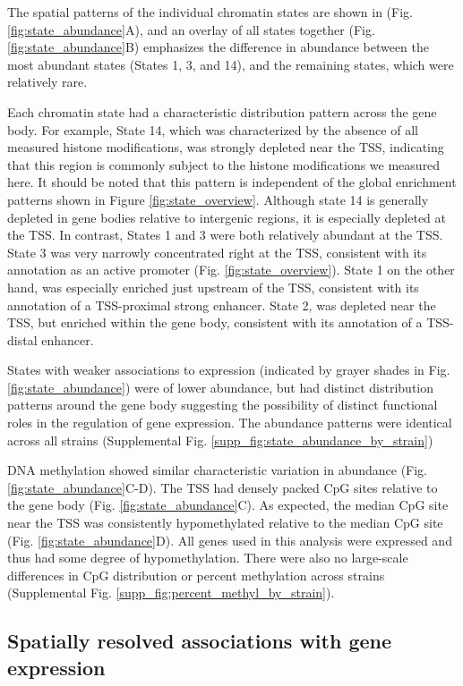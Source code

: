 \documentclass[
  11pt,
]{article}
\begin{document}
The spatial patterns of the individual chromatin states are shown in
(Fig. \ref{fig:state_abundance}A), and an overlay of all states together
(Fig. \ref{fig:state_abundance}B) emphasizes the difference in abundance
between the most abundant states (States 1, 3, and 14), and the
remaining states, which were relatively rare.

Each chromatin state had a characteristic distribution pattern across
the gene body. For example, State 14, which was characterized by the
absence of all measured histone modifications, was strongly depleted
near the TSS, indicating that this region is commonly subject to the
histone modifications we measured here. It should be noted that this
pattern is independent of the global enrichment patterns shown in Figure
\ref{fig:state_overview}. Although state 14 is generally depleted in
gene bodies relative to intergenic regions, it is especially depleted at
the TSS. In contrast, States 1 and 3 were both relatively abundant at
the TSS. State 3 was very narrowly concentrated right at the TSS,
consistent with its annotation as an active promoter (Fig.
\ref{fig:state_overview}). State 1 on the other hand, was especially
enriched just upstream of the TSS, consistent with its annotation of a
TSS-proximal strong enhancer. State 2, was depleted near the TSS, but
enriched within the gene body, consistent with its annotation of a
TSS-distal enhancer.

States with weaker associations to expression (indicated by grayer
shades in Fig. \ref{fig:state_abundance}) were of lower abundance, but
had distinct distribution patterns around the gene body suggesting the
possibility of distinct functional roles in the regulation of gene
expression. The abundance patterns were identical across all strains
(Supplemental Fig. \ref{supp_fig:state_abundance_by_strain})

DNA methylation showed similar characteristic variation in abundance
(Fig. \ref{fig:state_abundance}C-D). The TSS had densely packed CpG
sites relative to the gene body (Fig. \ref{fig:state_abundance}C). As
expected, the median CpG site near the TSS was consistently
hypomethylated relative to the median CpG site (Fig.
\ref{fig:state_abundance}D). All genes used in this analysis were
expressed and thus had some degree of hypomethylation. There were also
no large-scale differences in CpG distribution or percent methylation
across strains (Supplemental Fig.
\ref{supp_fig:percent_methyl_by_strain}).

\hypertarget{spatially-resolved-associations-with-gene-expression}{%
\subsection{Spatially resolved associations with gene
expression}\label{spatially-resolved-associations-with-gene-expression}}
\end{document}
